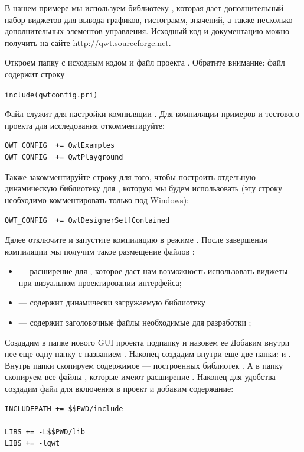В нашем примере мы используем библиотеку , которая дает дополнительный набор виджетов для вывода графиков,
гистограмм, значений, а также несколько дополнительных элементов управления. Исходный код и документацию можно получить
на сайте \url{http://qwt.sourceforge.net}. 

Откроем папку с исходным кодом и файл проекта . Обратите внимание: файл 
содержит строку 

\lstinline!include(qwtconfig.pri)!

Файл  служит для настройки компиляции . Для компиляции примеров и тестового проекта для
исследования  откомментируйте: 
\begin{lstlisting}
QWT_CONFIG  += QwtExamples
QWT_CONFIG  += QwtPlayground
\end{lstlisting}

Также закомментируйте строку для того, чтобы построить отдельную динамическую библиотеку для , которую мы будем
использовать (эту строку необходимо комментировать только под Windows): 

\lstinline!QWT_CONFIG  += QwtDesignerSelfContained!

Далее отключите  и запустите компиляцию в режиме . После завершения компиляции мы получим такое
размещение файлов :

\begin{itemize}
\item {}--- расширение для , которое даст нам возможность
использовать виджеты  при визуальном проектировании интерфейса;
\item {} --- содержит динамически загружаемую библиотеку  
\item {} --- содержит заголовочные файлы необходимые для разработки ;
\end{itemize}
Создадим в папке нового GUI проекта подпапку и назовем ее  Добавим внутри нее еще одну папку с
названием . Наконец создадим внутри  еще две папки:  и
. Внутрь папки  скопируем содержимое  --- построенных
библиотек  . А в папку  скопируем все файлы , которые
имеют расширение . Наконец для удобства создадим файл для включения в проект 
 и добавим содержание:

\begin{lstlisting}
INCLUDEPATH += $$PWD/include

LIBS += -L$$PWD/lib
LIBS += -lqwt
\end{lstlisting}

